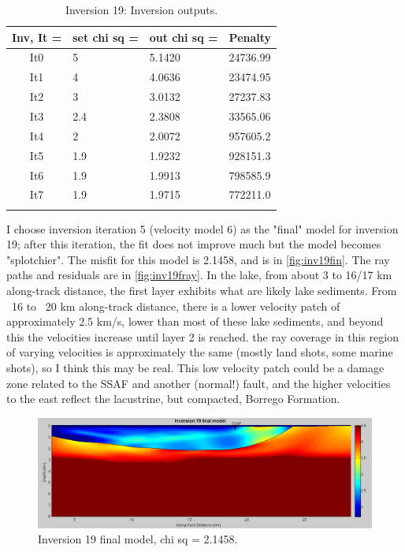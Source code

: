 \documentclass[fontsize=11pt, %
                             paper=a4, %
                             twoside, %
                             captions=tableheading,
                             index=totoc,
                             hyperref]{labbook}
\begin{document}
\begin{addmargin}[4cm]{0cm}
\begin{table}[!ht]
\label{tab:i19}
\raggedleft
\begin{tabular}{c l l l}
\toprule
\textbf{Inv, It = } & \textbf{set chi sq =} & \textbf{out chi sq =} & \textbf{Penalty} \\
\toprule
It0 & 5 & 5.1420 & 24736.99\\
It1 & 4 & 4.0636 & 23474.95\\
It2 & 3 & 3.0132 & 27237.83\\
It3 & 2.4 & 2.3808 & 33565.06\\
It4 & 2 & 2.0072 & 957605.2\\
It5 & 1.9 & 1.9232 & 928151.3\\
It6 & 1.9 & 1.9913 & 798585.9\\
It7 & 1.9 & 1.9715 & 772211.0\\
\bottomrule\\
\end{tabular}
\caption{Inversion 19: Inversion outputs.}
\end{table}

\clearpage{}

I choose inversion iteration 5 (velocity model 6) as the "final" model for inversion 19; after this iteration, the fit does not improve much but the model becomes "splotchier".  The misfit for this model is 2.1458, and is in \autoref{fig:inv19fin}.  The ray paths and residuals are in \autoref{fig:inv19fray}.  In the lake, from about 3 to 16/17 km along-track distance, the first layer exhibits what are likely lake sediments.  From ~16 to ~20 km along-track distance, there is a lower velocity patch of approximately 2.5 km/s, lower than most of these lake sediments, and beyond this the velocities increase until layer 2 is reached.  the ray coverage in this region of varying velocities is approximately the same (mostly land shots, some marine shots), so I think this may be real.  This low velocity patch could be a damage zone related to the SSAF and another (normal!) fault, and the higher velocities to the east reflect the lacustrine, but compacted, Borrego Formation.

\begin{figure}[h!]
\raggedleft
\includegraphics[scale=0.4,keepaspectratio=true]{figs/Inv19final.png}
\caption{Inversion 19 final model, chi sq = 2.1458.}
\label{fig:inv19fin}
\end{figure} 
 

\end{addmargin}
\end{document}

